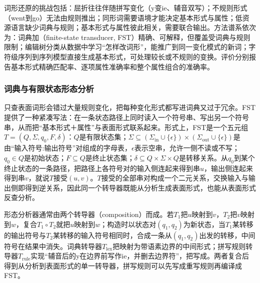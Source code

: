 词形还原的挑战包括：屈折往往伴随拼写变化（y变ie、辅音双写）；不规则形式（went到go）无法由规则推出；同形词需要语境才能决定基本形式与属性；低资源语言缺少词典与规则；基本形式与属性彼此相关，需要联合输出。方法谱系依次为：词典加（finite-state transducer, FST）精确、可解释，但覆盖受词典与规则限制；编辑树分类从数据中学习“怎样改词形”，能推广到同一变化模式的新词；字符级序列到序列模型直接生成基本形式，可处理较长或不规则的变换。评价分别报告基本形式精确匹配率、逐项属性准确率和整个属性组合的准确率。

\subsubsection{词典与有限状态形态分析}
\label{sec:nlp-analysis-fst}

只查表面词形会错过大量规则变化，把每种变化形式都写进词典又过于冗余。FST提供了一种紧凑写法：在一条状态路径上同时读入一个符号串、写出另一个符号串，从而把“基本形式＋属性”与表面形式联系起来。形式上，FST是一个五元组$T=(Q,\Sigma,q_0,F,\delta)$：$Q$是有限状态集；$\Sigma\subseteq(\Sigma_{\mathrm{in}}\cup\{\epsilon\})\times(\Sigma_{\mathrm{out}}\cup\{\epsilon\})$是由“输入符号:输出符号”对组成的字母表，$\epsilon$表示空串，允许一侧不读或不写；$q_0\in Q$是初始状态；$F\subseteq Q$是终止状态集；$\delta\subseteq Q\times\Sigma\times Q$是转移关系。从$q_0$到某个终止状态的一条路径，把路径上各符号对的输入侧连起来得到串$u$，输出侧连起来得到串$v$，就说$T$接受$(u,v)$。$T$接受的全部串对构成一个二元关系，交换输入与输出侧即得到逆关系，因此同一个转导器既能从分析生成表面形式，也能从表面形式反查分析。

形态分析器通常由两个转导器（composition）而成。若$T_1$把$u$映射到$v$，$T_2$把$v$映射到$w$，复合$T_1\circ T_2$就把$u$映射到$w$；构造时以状态对$(q_1,q_2)$为新状态，当$T_1$某转移的输出符号与$T_2$某转移的输入符号相同时，合成一条从$(q_1,q_2)$出发的转移，中间符号在结果中消失。词典转导器$T_{\mathrm{lex}}$把映射为带语素边界的中间形式；拼写规则转导器$T_{\mathrm{rule}}$实现“辅音后的y在边界前写作ie，并删去边界符”，把写成。两者复合后得到从分析到表面形式的单一转导器，拼写规则可以先写成重写规则再编译成FST。


